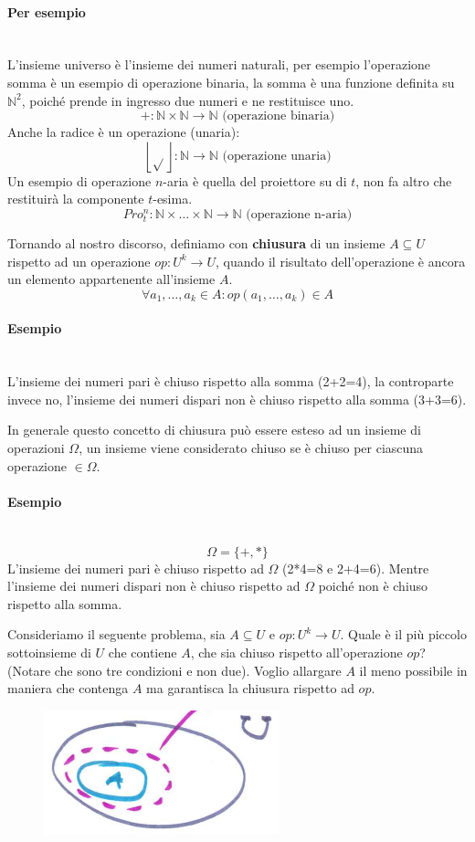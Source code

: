 \documentclass{article}
\begin{document}
\paragraph{Per esempio}\mbox{}\\
L'insieme universo è l'insieme dei numeri naturali, per esempio l'operazione somma è un
esempio di operazione binaria, la somma è una funzione definita su $\mathbb{N}^2$, poiché
prende in ingresso due numeri e ne restituisce uno.
$$+:\mathbb{N}\times\mathbb{N}\rightarrow\mathbb{N}\text{ (operazione binaria)}$$
Anche la radice è un operazione (unaria):
$$\left\lfloor \sqrt{} \right\rfloor:\mathbb{N}\rightarrow\mathbb{N}\text{ (operazione unaria)}$$
Un esempio di operazione $n$-aria è quella del proiettore su di $t$, non
fa altro che restituirà la componente $t$-esima.
$$Pro_t^n:\mathbb{N}\times\dots\times\mathbb{N}\rightarrow\mathbb{N}\text{ (operazione n-aria)}$$

Tornando al nostro discorso, definiamo con \textbf{chiusura} di un insieme $A\subseteq U$
rispetto ad un operazione $op:U^k\rightarrow U$, quando il risultato dell'operazione è ancora
un elemento appartenente all'insieme $A$.
$$\forall a_1,\dots,a_k\in A:op(a_1,\dots,a_k)\in A$$

\paragraph{Esempio}\mbox{}\\
L'insieme dei numeri pari è chiuso rispetto alla somma (2+2=4), la controparte invece no, l'insieme
dei numeri dispari non è chiuso rispetto alla somma (3+3=6).

In generale questo concetto di chiusura può essere esteso ad un insieme di operazioni $\Omega$,
un insieme viene considerato chiuso se è chiuso per ciascuna operazione $\in\Omega$.
\paragraph{Esempio}\mbox{}\\
$$\Omega=\{+,*\}$$
L'insieme dei numeri pari è chiuso rispetto ad $\Omega$ (2*4=8 e 2+4=6). Mentre l'insieme
dei numeri dispari non è chiuso rispetto ad $\Omega$ poiché non è chiuso rispetto alla somma.

Consideriamo il seguente problema, sia $A\subseteq U$ e $op:U^k\rightarrow U$. Quale è il più
piccolo sottoinsieme di $U$ che contiene $A$, che sia chiuso rispetto all'operazione $op$?
(Notare che sono tre condizioni e non due). Voglio allargare $A$ il meno possibile in maniera
che contenga $A$ ma garantisca la chiusura rispetto ad $op$.
\begin{figure}[H]
    \centering
    \includegraphics[scale=0.5]{images/insieme_piu_piccolo.png}

\end{figure}
\end{document}
